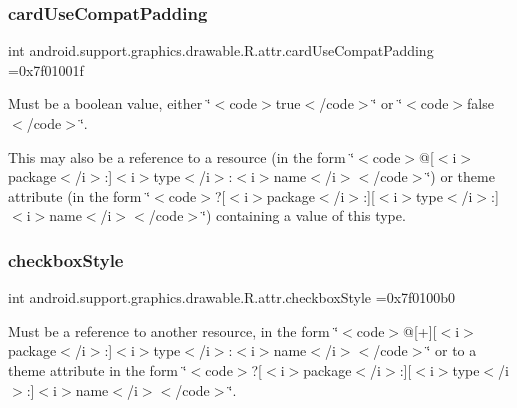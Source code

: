 \subsubsection{\texorpdfstring{card\+Use\+Compat\+Padding}{cardUseCompatPadding}}
{\footnotesize\ttfamily int android.\+support.\+graphics.\+drawable.\+R.\+attr.\+card\+Use\+Compat\+Padding =0x7f01001f\hspace{0.3cm}{\ttfamily [static]}}

Must be a boolean value, either \char`\"{}$<$code$>$true$<$/code$>$\char`\"{} or \char`\"{}$<$code$>$false$<$/code$>$\char`\"{}. 

This may also be a reference to a resource (in the form \char`\"{}$<$code$>$@\mbox{[}$<$i$>$package$<$/i$>$\+:\mbox{]}$<$i$>$type$<$/i$>$\+:$<$i$>$name$<$/i$>$$<$/code$>$\char`\"{}) or theme attribute (in the form \char`\"{}$<$code$>$?\mbox{[}$<$i$>$package$<$/i$>$\+:\mbox{]}\mbox{[}$<$i$>$type$<$/i$>$\+:\mbox{]}$<$i$>$name$<$/i$>$$<$/code$>$\char`\"{}) containing a value of this type. \mbox{\label{classandroid_1_1support_1_1graphics_1_1drawable_1_1R_1_1attr_a6c538f08a5a6b7fa5cc2eb8e3be0fcc0}} 
\subsubsection{\texorpdfstring{checkbox\+Style}{checkboxStyle}}
{\footnotesize\ttfamily int android.\+support.\+graphics.\+drawable.\+R.\+attr.\+checkbox\+Style =0x7f0100b0\hspace{0.3cm}{\ttfamily [static]}}

Must be a reference to another resource, in the form \char`\"{}$<$code$>$@\mbox{[}+\mbox{]}\mbox{[}$<$i$>$package$<$/i$>$\+:\mbox{]}$<$i$>$type$<$/i$>$\+:$<$i$>$name$<$/i$>$$<$/code$>$\char`\"{} or to a theme attribute in the form \char`\"{}$<$code$>$?\mbox{[}$<$i$>$package$<$/i$>$\+:\mbox{]}\mbox{[}$<$i$>$type$<$/i$>$\+:\mbox{]}$<$i$>$name$<$/i$>$$<$/code$>$\char`\"{}. \mbox{\label{classandroid_1_1support_1_1graphics_1_1drawable_1_1R_1_1attr_a756450421a818fa4152f843c3a6ef4ae}} 
